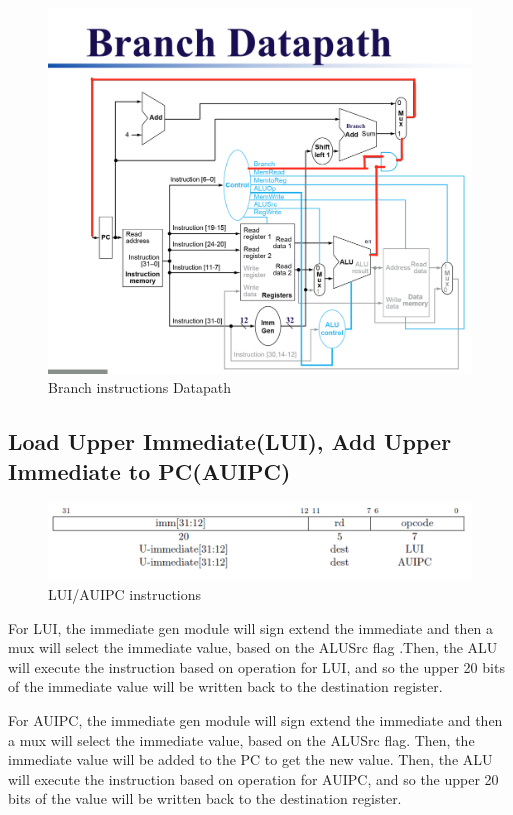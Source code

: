 \documentclass[20pt]{article}
\begin{document}
\begin{figure}[H]
	\includegraphics[width=0.9\linewidth]{Branchdatapath}
	\caption{Branch instructions Datapath}
\end{figure}

 \subsection{Load Upper Immediate(LUI), Add Upper Immediate to PC(AUIPC)}

\begin{figure}[H]
	\includegraphics[width=\linewidth]{Utype}
	\caption{LUI/AUIPC instructions }
\end{figure}

For LUI, the immediate gen module will sign extend the immediate and then a mux will select the immediate value, based on the ALUSrc flag .Then, the ALU will execute the instruction based on operation for LUI, and so the upper 20 bits of the immediate value will be written back to the destination register.

For AUIPC, the immediate gen module will sign extend the immediate and then a mux will select the immediate value, based on the ALUSrc flag. Then, the immediate value will be added to the PC to get the new value. Then, the ALU will execute the instruction based on operation for AUIPC, and so the upper 20 bits of the value will be written back to the destination register.
\end{document}

